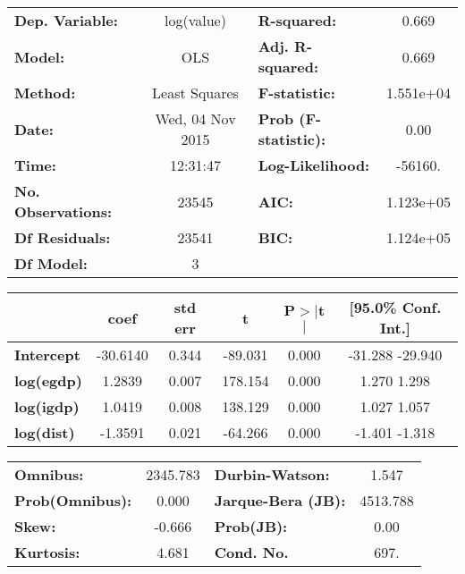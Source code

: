 \begin{center}
\begin{tabular}{lclc}
\toprule
\textbf{Dep. Variable:}    &    log(value)    & \textbf{  R-squared:         } &     0.669   \\
\textbf{Model:}            &       OLS        & \textbf{  Adj. R-squared:    } &     0.669   \\
\textbf{Method:}           &  Least Squares   & \textbf{  F-statistic:       } & 1.551e+04   \\
\textbf{Date:}             & Wed, 04 Nov 2015 & \textbf{  Prob (F-statistic):} &     0.00    \\
\textbf{Time:}             &     12:31:47     & \textbf{  Log-Likelihood:    } &   -56160.   \\
\textbf{No. Observations:} &       23545      & \textbf{  AIC:               } & 1.123e+05   \\
\textbf{Df Residuals:}     &       23541      & \textbf{  BIC:               } & 1.124e+05   \\
\textbf{Df Model:}         &           3      & \textbf{                     } &             \\
\bottomrule
\end{tabular}
\begin{tabular}{lccccc}
                   & \textbf{coef} & \textbf{std err} & \textbf{t} & \textbf{P$>$$|$t$|$} & \textbf{[95.0\% Conf. Int.]}  \\
\midrule
\textbf{Intercept} &     -30.6140  &        0.344     &   -89.031  &         0.000        &       -31.288   -29.940       \\
\textbf{log(egdp)} &       1.2839  &        0.007     &   178.154  &         0.000        &         1.270     1.298       \\
\textbf{log(igdp)} &       1.0419  &        0.008     &   138.129  &         0.000        &         1.027     1.057       \\
\textbf{log(dist)} &      -1.3591  &        0.021     &   -64.266  &         0.000        &        -1.401    -1.318       \\
\bottomrule
\end{tabular}
\begin{tabular}{lclc}
\textbf{Omnibus:}       & 2345.783 & \textbf{  Durbin-Watson:     } &    1.547  \\
\textbf{Prob(Omnibus):} &   0.000  & \textbf{  Jarque-Bera (JB):  } & 4513.788  \\
\textbf{Skew:}          &  -0.666  & \textbf{  Prob(JB):          } &     0.00  \\
\textbf{Kurtosis:}      &   4.681  & \textbf{  Cond. No.          } &     697.  \\
\bottomrule
\end{tabular}
\end{center}
